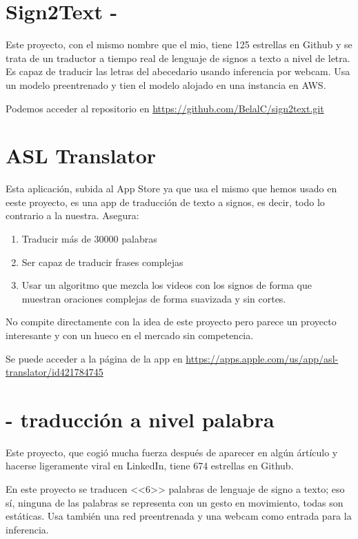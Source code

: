 
\section{Sign2Text - }

Este proyecto, con el mismo nombre que el mio, tiene 125 estrellas en Github y se trata de un traductor a tiempo real de lenguaje de signos  a texto a nivel de letra. Es capaz de traducir las letras del abecedario usando inferencia por webcam. Usa un modelo preentrenado  y tien el modelo alojado en una instancia en AWS.

Podemos acceder al repositorio en \url{https://github.com/BelalC/sign2text.git}

\section{ASL Translator}

Esta aplicación, subida al App Store ya que usa el mismo  que hemos usado en eeste proyecto, es una app de traducción de texto a signos, es decir, todo lo contrario a la nuestra. Asegura:

\begin{enumerate}
  \item Traducir más de 30000 palabras
  \item Ser capaz de traducir frases complejas
  \item Usar un algoritmo que mezcla los videos con los signos de forma que muestran oraciones complejas de forma suavizada y sin cortes.
\end{enumerate}

No compite directamente con la idea de este proyecto pero parece un proyecto interesante y con un hueco en el mercado sin competencia.

Se puede acceder a la página de la app en \url{https://apps.apple.com/us/app/asl-translator/id421784745}

\section{ - traducción a nivel palabra}

Este proyecto, que cogió mucha fuerza después de aparecer en algún ártículo y hacerse ligeramente viral en LinkedIn, tiene 674 estrellas en Github.

En este proyecto se traducen <<6>> palabras de lenguaje de signo a texto; eso sí, ninguna de las palabras se representa con un gesto en movimiento, todas son estáticas. Usa también una red preentrenada y una webcam como entrada para la inferencia.

